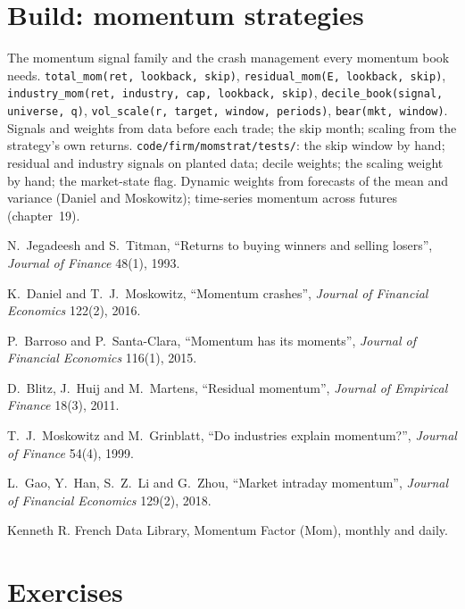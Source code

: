 \section{Build: momentum strategies}\label{bld:s1:momentum:momstrat}

\begin{build}
 The momentum signal family and the crash management every momentum book needs.
 \texttt{total\_mom(ret, lookback, skip)}, \texttt{residual\_mom(E, lookback, skip)}, \texttt{industry\_mom(ret, industry, cap, lookback,
skip)}, \texttt{decile\_book(signal, universe, q)}, \texttt{vol\_scale(r, target, window, periods)}, \texttt{bear(mkt, window)}.
 Signals and weights from data before each trade; the skip month; scaling from the strategy's own returns.
 \texttt{code/firm/momstrat/tests/}: the skip window by hand; residual and industry signals on planted data; decile weights; the
scaling weight by hand; the market-state flag.
 Dynamic weights from forecasts of the mean and variance (Daniel and Moskowitz); time-series momentum across futures (chapter~19).
\end{build}

\begin{omsources}
\item N.~Jegadeesh and S.~Titman, ``Returns to buying winners and selling losers'', \emph{Journal of Finance} 48(1), 1993.
\item K.~Daniel and T.~J.~Moskowitz, ``Momentum crashes'', \emph{Journal of Financial Economics} 122(2), 2016.
\item P.~Barroso and P.~Santa-Clara, ``Momentum has its moments'', \emph{Journal of Financial Economics} 116(1), 2015.
\item D.~Blitz, J.~Huij and M.~Martens, ``Residual momentum'', \emph{Journal of Empirical Finance} 18(3), 2011.
\item T.~J.~Moskowitz and M.~Grinblatt, ``Do industries explain momentum?'', \emph{Journal of Finance} 54(4), 1999.
\item L.~Gao, Y.~Han, S.~Z.~Li and G.~Zhou, ``Market intraday momentum'', \emph{Journal of Financial Economics} 129(2), 2018.
\item Kenneth R. French Data Library, Momentum Factor (Mom), monthly and daily.
\end{omsources}

\section{Exercises}

